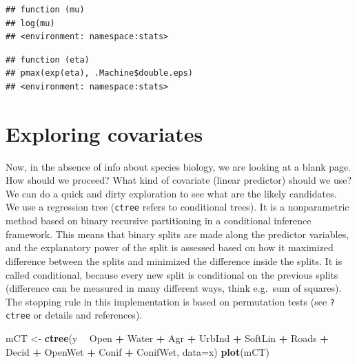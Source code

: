 \documentclass[12pt,]{book}
\newenvironment{Shaded}{\begin{snugshade}}{\end{snugshade}}
\newcommand{\DataTypeTok}[1]{\textcolor[rgb]{0.13,0.29,0.53}{#1}}
\newcommand{\KeywordTok}[1]{\textcolor[rgb]{0.13,0.29,0.53}{\textbf{#1}}}
\newcommand{\NormalTok}[1]{#1}
\newcommand{\OperatorTok}[1]{\textcolor[rgb]{0.81,0.36,0.00}{\textbf{#1}}}
\newcommand{\StringTok}[1]{\textcolor[rgb]{0.31,0.60,0.02}{#1}}
\begin{document}
\begin{verbatim}
## function (mu) 
## log(mu)
## <environment: namespace:stats>
\end{verbatim}

\begin{Shaded}
\end{Shaded}

\begin{verbatim}
## function (eta) 
## pmax(exp(eta), .Machine$double.eps)
## <environment: namespace:stats>
\end{verbatim}

\hypertarget{exploring-covariates}{%
\section{Exploring covariates}\label{exploring-covariates}}

Now, in the absence of info about species biology, we are looking at a blank page.
How should we proceed? What kind of covariate (linear predictor) should we use?
We can do a quick and dirty exploration to see what are the likely candidates.
We use a regression tree (\texttt{ctree} refers to conditional trees). It is
a nonparametric method based on binary recursive partitioning in a conditional inference framework.
This means that binary splits are made along the predictor variables,
and the explanatory power of the split is assessed based on how it
maximized difference between the splits and minimized the difference inside the splits.
It is called conditional, because every new split is conditional on the previous splits
(difference can be measured in many different ways, think e.g.~sum of squares).
The stopping rule in this implementation is based on permutation tests (see \texttt{?ctree} or details
and references).

\begin{Shaded}
\begin{Highlighting}[]
\NormalTok{mCT <-}\StringTok{ }\KeywordTok{ctree}\NormalTok{(y }\OperatorTok{~}\StringTok{ }\NormalTok{Open }\OperatorTok{+}\StringTok{ }\NormalTok{Water }\OperatorTok{+}\StringTok{ }\NormalTok{Agr }\OperatorTok{+}\StringTok{ }\NormalTok{UrbInd }\OperatorTok{+}\StringTok{ }\NormalTok{SoftLin }\OperatorTok{+}\StringTok{ }\NormalTok{Roads }\OperatorTok{+}\StringTok{ }
\StringTok{  }\NormalTok{Decid }\OperatorTok{+}\StringTok{ }\NormalTok{OpenWet }\OperatorTok{+}\StringTok{ }\NormalTok{Conif }\OperatorTok{+}\StringTok{ }\NormalTok{ConifWet, }\DataTypeTok{data=}\NormalTok{x)}
\KeywordTok{plot}\NormalTok{(mCT)}
\end{Highlighting}
\end{Shaded}
\end{document}
